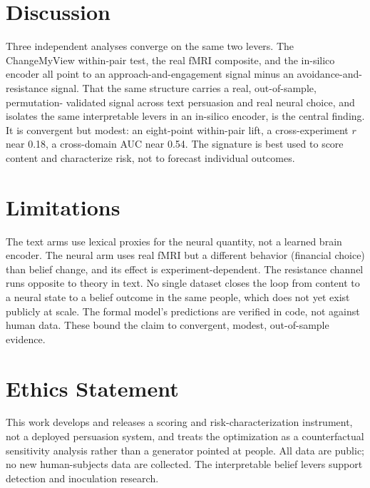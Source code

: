\documentclass[11pt]{article}
\begin{document}
\section{Discussion}
Three independent analyses converge on the same two levers. The ChangeMyView within-pair test, the real
fMRI composite, and the in-silico encoder all point to an approach-and-engagement signal minus an
avoidance-and-resistance signal. That the same structure carries a real, out-of-sample, permutation-
validated signal across text persuasion and real neural choice, and isolates the same interpretable levers
in an in-silico encoder, is the central finding. It is convergent but modest: an eight-point within-pair
lift, a cross-experiment $r$ near 0.18, a cross-domain AUC near 0.54. The signature is best used to score
content and characterize risk, not to forecast individual outcomes.

\section*{Limitations}
The text arms use lexical proxies for the neural quantity, not a learned brain encoder. The neural arm
uses real fMRI but a different behavior (financial choice) than belief change, and its effect is
experiment-dependent. The resistance channel runs opposite to theory in text. No single dataset closes the
loop from content to a neural state to a belief outcome in the same people, which does not yet exist
publicly at scale. The formal model's predictions are verified in code, not against human data. These bound
the claim to convergent, modest, out-of-sample evidence.

\section*{Ethics Statement}
This work develops and releases a scoring and risk-characterization instrument, not a deployed persuasion
system, and treats the optimization as a counterfactual sensitivity analysis rather than a generator
pointed at people. All data are public; no new human-subjects data are collected. The interpretable belief
levers support detection and inoculation research.


\end{document}
